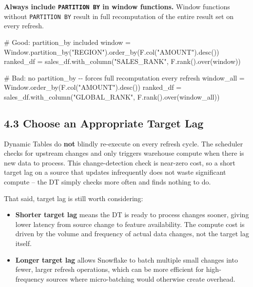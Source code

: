 \documentclass[
  letterpaper,
  DIV=11,
  numbers=noendperiod]{scrreprt}
\newenvironment{Shaded}{\begin{snugshade}}{\end{snugshade}}
\newcommand{\CommentTok}[1]{\textcolor[rgb]{0.37,0.37,0.37}{#1}}
\newcommand{\NormalTok}[1]{\textcolor[rgb]{0.00,0.23,0.31}{#1}}
\newcommand{\OperatorTok}[1]{\textcolor[rgb]{0.37,0.37,0.37}{#1}}
\newcommand{\StringTok}[1]{\textcolor[rgb]{0.13,0.47,0.30}{#1}}
\providecommand{\tightlist}{%
  \setlength{\itemsep}{0pt}\setlength{\parskip}{0pt}}\usepackage{longtable,booktabs,array}
\begin{document}
\textbf{Always include \texttt{PARTITION\ BY} in window functions.}
Window functions without \texttt{PARTITION\ BY} result in full
recomputation of the entire result set on every refresh.

\begin{Shaded}
\begin{Highlighting}[]
\CommentTok{\# Good: partition\_by included}
\NormalTok{window }\OperatorTok{=}\NormalTok{ Window.partition\_by(}\StringTok{"REGION"}\NormalTok{).order\_by(F.col(}\StringTok{"AMOUNT"}\NormalTok{).desc())}
\NormalTok{ranked\_df }\OperatorTok{=}\NormalTok{ sales\_df.with\_column(}\StringTok{"SALES\_RANK"}\NormalTok{, F.rank().over(window))}

\CommentTok{\# Bad: no partition\_by {-}{-} forces full recomputation every refresh}
\NormalTok{window\_all }\OperatorTok{=}\NormalTok{ Window.order\_by(F.col(}\StringTok{"AMOUNT"}\NormalTok{).desc())}
\NormalTok{ranked\_df }\OperatorTok{=}\NormalTok{ sales\_df.with\_column(}\StringTok{"GLOBAL\_RANK"}\NormalTok{, F.rank().over(window\_all))}
\end{Highlighting}
\end{Shaded}

\hypertarget{choose-an-appropriate-target-lag}{%
\subsection{4.3 Choose an Appropriate Target
Lag}\label{choose-an-appropriate-target-lag}}

Dynamic Tables do \textbf{not} blindly re-execute on every refresh
cycle. The scheduler checks for upstream changes and only triggers
warehouse compute when there is new data to process. This
change-detection check is near-zero cost, so a short target lag on a
source that updates infrequently does not waste significant compute --
the DT simply checks more often and finds nothing to do.

That said, target lag is still worth considering:

\begin{itemize}
\tightlist
\item
  \textbf{Shorter target lag} means the DT is ready to process changes
  sooner, giving lower latency from source change to feature
  availability. The compute cost is driven by the volume and frequency
  of actual data changes, not the target lag itself.
\item
  \textbf{Longer target lag} allows Snowflake to batch multiple small
  changes into fewer, larger refresh operations, which can be more
  efficient for high-frequency sources where micro-batching would
  otherwise create overhead.
\end{itemize}
\end{document}
